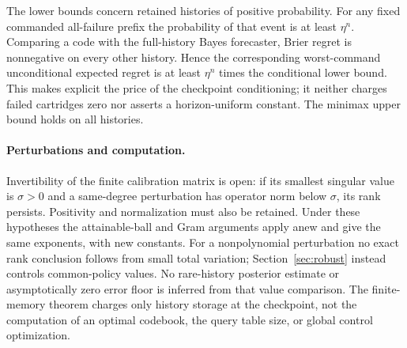 The lower bounds concern retained histories of positive probability. For
any fixed commanded all-failure prefix the probability of that event is at
least $\eta^n$. Comparing a code with the full-history Bayes forecaster,
Brier regret is nonnegative on every other history. Hence the corresponding
worst-command unconditional expected regret is at least $\eta^n$ times the
conditional lower bound. This makes explicit the price of the checkpoint
conditioning; it neither charges failed cartridges zero nor asserts a
horizon-uniform constant. The minimax upper bound holds on all histories.

\paragraph{Perturbations and computation.}
Invertibility of the finite calibration matrix is open: if its smallest
singular value is $\sigma>0$ and a same-degree perturbation has operator
norm below $\sigma$, its rank persists. Positivity and normalization must
also be retained. Under these hypotheses the attainable-ball and Gram
arguments apply anew and give the same exponents, with new constants.
For a nonpolynomial perturbation no exact rank conclusion follows from
small total variation; Section~\ref{sec:robust} instead controls common-policy
values. No rare-history posterior estimate or asymptotically zero error
floor is inferred from that value comparison. The finite-memory theorem
charges only history storage at the checkpoint, not the computation of an
optimal codebook, the query table size, or global control optimization.
